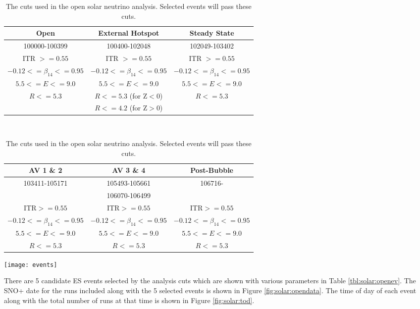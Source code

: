\begin{table}[]
\begin{center}
\begin{tabular}{c|c|c}
Open & External Hotspot & Steady State  \\ \hline
100000-100399 & 100400-102048 & 102049-103402 \\ \hline
ITR $ >= 0.55$ & ITR $ >= 0.55$ & ITR $ >= 0.55$ \\
$-0.12 <= \beta_{14} <= 0.95$ & $-0.12 <= \beta_{14} <= 0.95$ & $-0.12 <= \beta_{14} <= 0.95$ \\
$5.5 <= E <= 9.0$ & $5.5 <= E <= 9.0$ & $5.5 <= E <= 9.0$ \\
$R <= 5.3$ & $R <= 5.3$ (for Z$<$0) & $R <= 5.3$ \\
 & $R <= 4.2$ (for Z$>$0) & \\
\end{tabular}
\\[2\baselineskip]
\begin{tabular}{c|c|c}
AV 1 \& 2 & AV 3 \& 4 & Post-Bubble \\ \hline
103411-105171 & 105493-105661 & 106716- \\
& 106070-106499 & \\ \hline
ITR$ >= 0.55$ & ITR$ >= 0.55$ & ITR$ >= 0.55$ \\
$-0.12 <= \beta_{14} <= 0.95$ & $-0.12 <= \beta_{14} <= 0.95$ & $-0.12 <= \beta_{14} <= 0.95$ \\
$5.5 <= E <= 9.0$ & $5.5 <= E <= 9.0$ & $5.5 <= E <= 9.0$ \\
$R <= 5.3$ & $R <= 5.3$ & $R <= 5.3$ \\
\end{tabular}
\caption{The cuts used in the open solar neutrino analysis. Selected events will pass these cuts.}
\label{tbl:solar:roi}
\end{center}
\end{table}

\begin{table}
\centering
\texttt{[image: events]}
\caption{The events selected by solar analysis cuts in the open dataset.}
\label{tbl:solar:openev}
\end{table}

There are 5 candidate ES events selected by the analysis cuts which are shown
with various parameters in Table \ref{tbl:solar:openev}.
The SNO+ date for the runs included along with the 5 selected events is shown
in Figure \ref{fig:solar:opendata}.
The time of day of each event along with the total number of runs at that time
is shown in Figure \ref{fig:solar:tod}.

